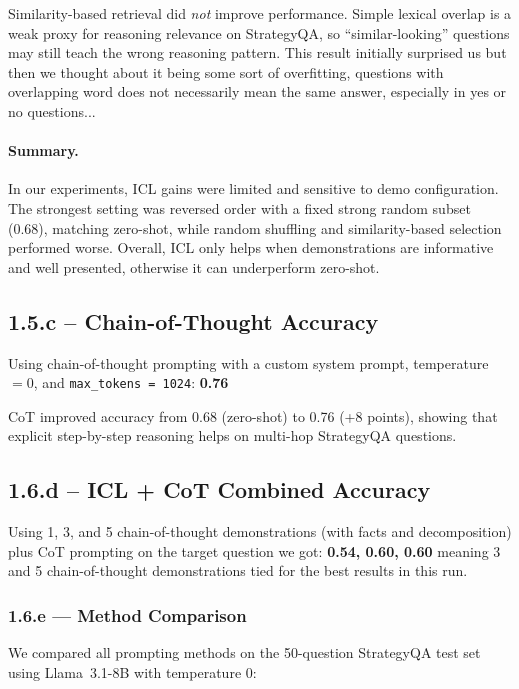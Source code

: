 \documentclass[11pt]{article}
\begin{document}
Similarity-based retrieval did \emph{not} improve performance.
Simple lexical overlap is a weak proxy for reasoning relevance on StrategyQA, so ``similar-looking'' questions may still teach the wrong reasoning pattern. This result initially surprised us but then we thought about it being some sort of overfitting, questions with overlapping word does not necessarily mean the same answer, especially in yes or no questions...

\paragraph{Summary.}
In our experiments, ICL gains were limited and sensitive to demo configuration.
The strongest setting was reversed order with a fixed strong random subset (0.68), matching zero-shot, while random shuffling and similarity-based selection performed worse.
Overall, ICL only helps when demonstrations are informative and well presented, otherwise it can underperform zero-shot.

\newpage
\subsection*{1.5.c -- Chain-of-Thought Accuracy}
Using chain-of-thought prompting with a custom system prompt, temperature $= 0$, and \texttt{max\_tokens = 1024}: \textbf{0.76}

CoT improved accuracy from 0.68 (zero-shot) to 0.76 (+8 points), showing that explicit step-by-step reasoning helps on multi-hop StrategyQA questions.

\subsection*{1.6.d -- ICL + CoT Combined Accuracy}

Using 1, 3, and 5 chain-of-thought demonstrations (with facts and decomposition) plus CoT prompting on the target question we got: \textbf{0.54, 0.60, 0.60}
meaning 3 and 5 chain-of-thought demonstrations tied for the best results in this run.

\subsubsection*{1.6.e --- Method Comparison}

We compared all prompting methods on the 50-question StrategyQA test set using Llama~3.1-8B with temperature $0$:
\end{document}

